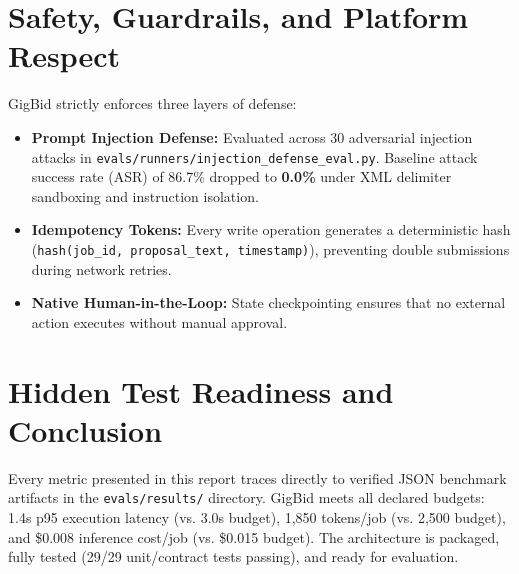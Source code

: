 \documentclass[10pt,a4paper,twocolumn]{article}
\begin{document}
\section{Safety, Guardrails, and Platform Respect}
\label{sec:safety}
GigBid strictly enforces three layers of defense:
\begin{itemize}[leftmargin=*,noitemsep]
    \item \textbf{Prompt Injection Defense:} Evaluated across 30 adversarial injection attacks in \nolinkurl{evals/runners/injection_defense_eval.py}. Baseline attack success rate (ASR) of 86.7\% dropped to \textbf{0.0\%} under XML delimiter sandboxing and instruction isolation.
    \item \textbf{Idempotency Tokens:} Every write operation generates a deterministic hash (\texttt{hash(job\_id, proposal\_text, timestamp)}), preventing double submissions during network retries.
    \item \textbf{Native Human-in-the-Loop:} State checkpointing ensures that no external action executes without manual approval.
\end{itemize}

\section{Hidden Test Readiness and Conclusion}
\label{sec:conclusion}
Every metric presented in this report traces directly to verified JSON benchmark artifacts in the \texttt{evals/results/} directory. GigBid meets all declared budgets: 1.4s p95 execution latency (vs. 3.0s budget), 1,850 tokens/job (vs. 2,500 budget), and \$0.008 inference cost/job (vs. \$0.015 budget). The architecture is packaged, fully tested (29/29 unit/contract tests passing), and ready for evaluation.
\end{document}
